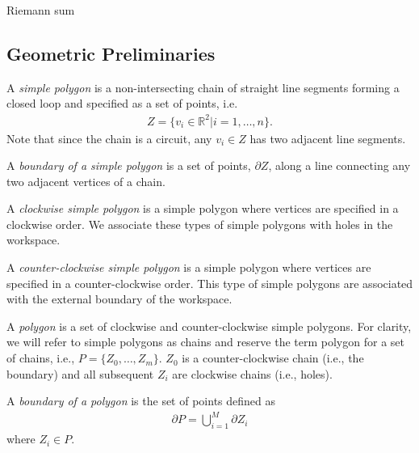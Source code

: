 \documentclass[../main.tex]{subfiles}
\begin{document}
Riemann sum

\subsection{Geometric Preliminaries}
\begin{definition}
A \emph{simple polygon} is a non-intersecting chain of straight line segments forming a closed loop and specified as a set of points, i.e.
	\begin{equation}
	\begin{aligned}
		Z=\{v_i\in\mathbb{R}^2|i=1,\ldots,n\}.
	\end{aligned}
	\end{equation}
Note that since the chain is a circuit, any $v_i\in Z$ has two adjacent line segments. 
\end{definition}

\begin{definition}
A \emph{boundary of a simple polygon} is a set of points, $\partial Z$, along a line connecting any two adjacent vertices of a chain. 
\end{definition}

\begin{definition}
A \emph{clockwise simple polygon} is a simple polygon where vertices are specified in a clockwise order. We associate these types of simple polygons with holes in the workspace. 
\end{definition}

\begin{definition}
A \emph{counter-clockwise simple polygon} is a simple polygon where vertices are specified in a counter-clockwise order. This type of simple polygons are associated with the external boundary of the workspace.
\end{definition}

\begin{definition}[Polygon]
A \emph{polygon} is a set of clockwise and counter-clockwise simple polygons. For clarity, we will refer to simple polygons as chains and reserve the term polygon for a set of chains, i.e., $P=\{Z_0,\ldots,Z_m\}$. $Z_0$ is a counter-clockwise chain (i.e., the boundary) and all subsequent $Z_i$ are clockwise chains (i.e., holes). 
\end{definition}

\begin{definition}
A \emph{boundary of a polygon} is the set of points defined as
	\begin{equation}
	\begin{aligned}
 		\partial P=\bigcup^M_{i=1}\partial Z_i
	\end{aligned}
	\end{equation}
where $Z_i\in P$.
\end{definition}
\end{document}
